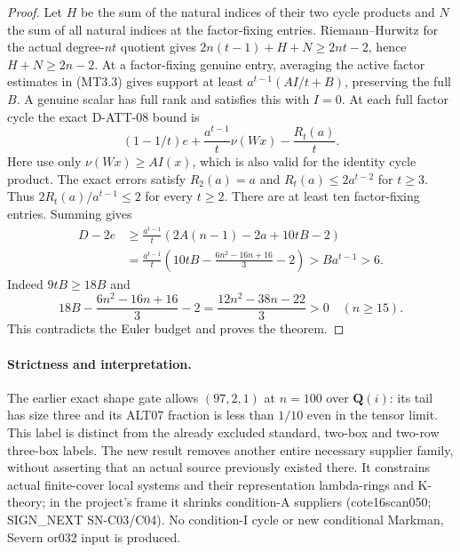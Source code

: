 \begin{proof}
Let $H$ be the sum of the natural indices of their two
cycle products and $N$ the sum of all natural indices
at the factor-fixing entries. Riemann--Hurwitz for the
actual degree-$nt$ quotient gives
$2n(t-1)+H+N\ge2nt-2$, hence $H+N\ge2n-2$.
At a factor-fixing genuine entry, averaging the active
factor estimates in (MT3.3) gives support at least
$a^{t-1}(AI/t+B)$, preserving the full $B$.
A genuine scalar has full rank and satisfies this with
$I=0$. At each full factor cycle the exact D-ATT-08 bound
is
\[
 (1-1/t)e+\frac{a^{t-1}}t\nu(Wx)-\frac{R_t(a)}t.
                                                                  \tag{MT3.12}
\]
Here use only $\nu(Wx)\ge AI(x)$, which is also valid
for the identity cycle product. The exact errors satisfy
$R_2(a)=a$ and $R_t(a)\le2a^{t-2}$ for $t\ge3$.
Thus $2R_t(a)/a^{t-1}\le2$ for every $t\ge2$.
There are at least ten factor-fixing entries. Summing gives
\[
 \begin{split}
 D-2e
 &\ge\frac{a^{t-1}}t
 \left(2A(n-1)-2a+10tB-2\right)\\
 &=\frac{a^{t-1}}t
 \left(10tB-\frac{6n^2-16n+16}{3}-2\right)
 >B a^{t-1}>6.
 \end{split}                                             \tag{MT3.13}
\]
Indeed $9tB\ge18B$ and
\[
 18B-\frac{6n^2-16n+16}{3}-2
                    =\frac{12n^2-38n-22}{3}>0
 \quad(n\ge15).                                         \tag{MT3.14}
\]
This contradicts the Euler budget and proves the theorem.
\end{proof}

\paragraph{Strictness and interpretation.}
The earlier exact shape gate allows $(97,2,1)$ at $n=100$
over $\mathbf Q(i)$: its tail has size three and its
ALT07 fraction is less than $1/10$ even in the tensor limit.
This label is distinct from the already excluded standard,
two-box and two-row three-box labels. The new result
removes another entire necessary supplier family, without
asserting that an actual source previously existed there.
It constrains actual finite-cover local systems and their
representation lambda-rings and K-theory; in the project's
frame it shrinks condition-A suppliers (cote16scan050;
SIGN_NEXT SN-C03/C04). No condition-I cycle or new conditional
Markman, Severn or032 input is produced.
